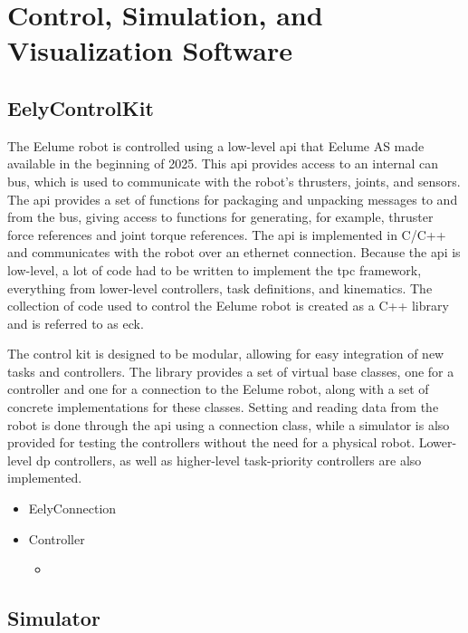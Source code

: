 \chapter{Control, Simulation, and Visualization Software}

\label{ch:software}

\section{EelyControlKit}

The Eelume robot is controlled using a low-level \gls{api} that Eelume AS made
available in the beginning of 2025.
This \gls{api} provides access to an internal \gls{can} bus, which is used to
communicate with the robot's thrusters, joints, and sensors. The \gls{api} provides
a set of functions for packaging and unpacking messages to and from the bus, giving
access to functions for generating, for example, thruster force references and
joint torque references.
The \gls{api} is implemented in C/C++ and communicates with the robot over
an ethernet connection. Because the \gls{api} is low-level, a lot of code had
to be written to implement the \gls{tpc} framework, everything from
lower-level controllers, task definitions, and kinematics. The collection of
code used to control the Eelume robot is created as a C++ library
and is referred to as \gls{eck}.

The control kit is designed to be modular, allowing for easy integration of
new tasks and controllers. The library provides a set of virtual base classes,
one for a controller and one for a connection to the Eelume robot, along with
a set of concrete implementations for these classes. Setting and reading data
from the robot is done through the \gls{api} using a connection class, while 
a simulator is also provided for testing the controllers without the need for
a physical robot. Lower-level \gls{dp} controllers, as well as higher-level
task-priority controllers are also implemented.

\begin{itemize}
    \item EelyConnection
    \item Controller
        \begin{itemize}
            \item 
        \end{itemize}
\end{itemize}

\section{Simulator}

